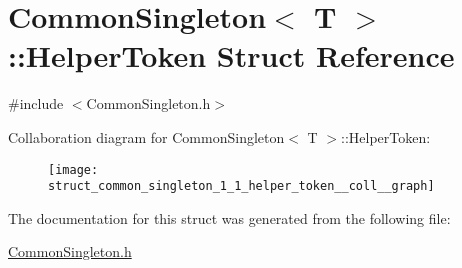 \hypertarget{struct_common_singleton_1_1_helper_token}{}\section{Common\+Singleton$<$ T $>$\+::Helper\+Token Struct Reference}
\label{struct_common_singleton_1_1_helper_token}


{\ttfamily \#include $<$Common\+Singleton.\+h$>$}



Collaboration diagram for Common\+Singleton$<$ T $>$\+::Helper\+Token\+:\nopagebreak
\begin{figure}[H]
\begin{center}
\leavevmode
\texttt{[image: struct\_common\_singleton\_1\_1\_helper\_token\_\_coll\_\_graph]}
\end{center}
\end{figure}


The documentation for this struct was generated from the following file\+:\begin{DoxyCompactItemize}
\item 
\mbox{\hyperlink{_common_singleton_8h}{Common\+Singleton.\+h}}\end{DoxyCompactItemize}
